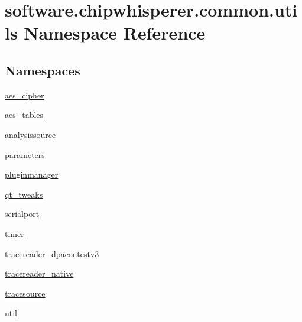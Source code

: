 \hypertarget{namespacesoftware_1_1chipwhisperer_1_1common_1_1utils}{}\section{software.\+chipwhisperer.\+common.\+utils Namespace Reference}
\label{namespacesoftware_1_1chipwhisperer_1_1common_1_1utils}
\subsection*{Namespaces}
\begin{DoxyCompactItemize}
\item 
 \hyperlink{namespacesoftware_1_1chipwhisperer_1_1common_1_1utils_1_1aes__cipher}{aes\+\_\+cipher}
\item 
 \hyperlink{namespacesoftware_1_1chipwhisperer_1_1common_1_1utils_1_1aes__tables}{aes\+\_\+tables}
\item 
 \hyperlink{namespacesoftware_1_1chipwhisperer_1_1common_1_1utils_1_1analysissource}{analysissource}
\item 
 \hyperlink{namespacesoftware_1_1chipwhisperer_1_1common_1_1utils_1_1parameters}{parameters}
\item 
 \hyperlink{namespacesoftware_1_1chipwhisperer_1_1common_1_1utils_1_1pluginmanager}{pluginmanager}
\item 
 \hyperlink{namespacesoftware_1_1chipwhisperer_1_1common_1_1utils_1_1qt__tweaks}{qt\+\_\+tweaks}
\item 
 \hyperlink{namespacesoftware_1_1chipwhisperer_1_1common_1_1utils_1_1serialport}{serialport}
\item 
 \hyperlink{namespacesoftware_1_1chipwhisperer_1_1common_1_1utils_1_1timer}{timer}
\item 
 \hyperlink{namespacesoftware_1_1chipwhisperer_1_1common_1_1utils_1_1tracereader__dpacontestv3}{tracereader\+\_\+dpacontestv3}
\item 
 \hyperlink{namespacesoftware_1_1chipwhisperer_1_1common_1_1utils_1_1tracereader__native}{tracereader\+\_\+native}
\item 
 \hyperlink{namespacesoftware_1_1chipwhisperer_1_1common_1_1utils_1_1tracesource}{tracesource}
\item 
 \hyperlink{namespacesoftware_1_1chipwhisperer_1_1common_1_1utils_1_1util}{util}
\end{DoxyCompactItemize}
